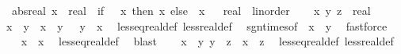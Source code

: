 \begin{isabellebody}
\isanewline
{}\isamarkupfalse%
\isanewline
\ \ abs{\isacharunderscore}{\kern0pt}real{\isacharcolon}{\kern0pt}\ {\isachardoublequoteopen}{\isasymbar}x\ {\isacharcolon}{\kern0pt}{\isacharcolon}{\kern0pt}\ real{\isasymbar}\ {\isacharequal}{\kern0pt}\ {\isacharparenleft}{\kern0pt}if\ {}\ {\isasymle}\ x\ then\ x\ else\ {\isacharminus}{\kern0pt}\ x{\isacharparenright}{\kern0pt}{\isachardoublequoteclose}\isanewline
\isanewline
{}\isamarkupfalse%
%
\isadelimproof
\ %
\endisadelimproof
%
\isatagproof
\isacommand{{\isachardot}{\kern0pt}{\isachardot}{\kern0pt}}\isamarkupfalse%
%
\endisatagproof
{\isafoldproof}%
%
\isadelimproof
%
\endisadelimproof
\isanewline
{}\isamarkupfalse%
\isanewline
\isanewline
{}\isamarkupfalse%
\ real\ {\isacharcolon}{\kern0pt}{\isacharcolon}{\kern0pt}\ linorder\isanewline
%
\isadelimproof
%
\endisadelimproof
%
\isatagproof
{}\isamarkupfalse%
\isanewline
\ \ \isamarkupfalse%
\ x\ y\ z\ {\isacharcolon}{\kern0pt}{\isacharcolon}{\kern0pt}\ real\isanewline
\ \ \isamarkupfalse%
\ {\isachardoublequoteopen}{\isacharparenleft}{\kern0pt}x\ {\isacharless}{\kern0pt}\ y{\isacharparenright}{\kern0pt}\ {\isacharequal}{\kern0pt}\ {\isacharparenleft}{\kern0pt}x\ {\isasymle}\ y\ {\isasymand}\ {\isasymnot}\ y\ {\isasymle}\ x{\isacharparenright}{\kern0pt}{\isachardoublequoteclose}\ \isamarkupfalse%
\ less{\isacharunderscore}{\kern0pt}eq{\isacharunderscore}{\kern0pt}real{\isacharunderscore}{\kern0pt}def\ less{\isacharunderscore}{\kern0pt}real{\isacharunderscore}{\kern0pt}def\ \isamarkupfalse%
\ sgn{\isacharunderscore}{\kern0pt}times{\isacharbrackleft}{\kern0pt}of\ {\isachardoublequoteopen}{\isacharminus}{\kern0pt}{}{\isachardoublequoteclose}\ {\isachardoublequoteopen}x\ {\isacharminus}{\kern0pt}\ y{\isachardoublequoteclose}{\isacharbrackright}{\kern0pt}\ \isamarkupfalse%
\ fastforce\isanewline
\ \ \isamarkupfalse%
\ {\isachardoublequoteopen}x\ {\isasymle}\ x{\isachardoublequoteclose}\ \isamarkupfalse%
\ less{\isacharunderscore}{\kern0pt}eq{\isacharunderscore}{\kern0pt}real{\isacharunderscore}{\kern0pt}def\ \isamarkupfalse%
\ blast\isanewline
\ \ \isamarkupfalse%
\ {\isachardoublequoteopen}{\isasymlbrakk}x\ {\isasymle}\ y{\isacharsemicolon}{\kern0pt}\ y\ {\isasymle}\ z{\isasymrbrakk}\ {\isasymLongrightarrow}\ x\ {\isasymle}\ z{\isachardoublequoteclose}\ \isamarkupfalse%
\ less{\isacharunderscore}{\kern0pt}eq{\isacharunderscore}{\kern0pt}real{\isacharunderscore}{\kern0pt}def\ less{\isacharunderscore}{\kern0pt}real{\isacharunderscore}{\kern0pt}def\ \isamarkupfalse%

\end{isabellebody}
